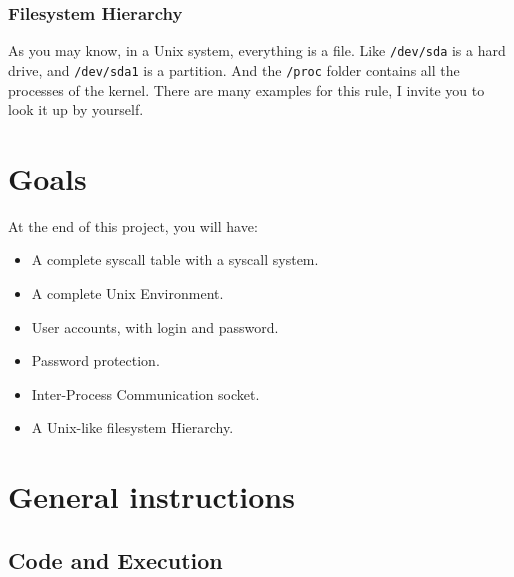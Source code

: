 \documentclass{42-en}
\begin{document}
    \subsection{Filesystem Hierarchy}
        As you may know, in a Unix system, everything is a file. Like
        \texttt{/dev/sda} is a hard drive, and \texttt{/dev/sda1} is a
        partition. And the \texttt{/proc} folder contains all the processes of
        the kernel. There are many examples for this rule, I invite you to
        look it up by yourself.

\chapter{Goals}

    At the end of this project, you will have:
    \begin{itemize}\itemsep1pt
        \item A complete syscall table with a syscall system.
        \item A complete Unix Environment.
        \item User accounts, with login and password.
        \item Password protection.
        \item Inter-Process Communication socket.
        \item A Unix-like filesystem Hierarchy.
    \end{itemize}

\chapter{General instructions}
    \section{Code and Execution}
\end{document}
